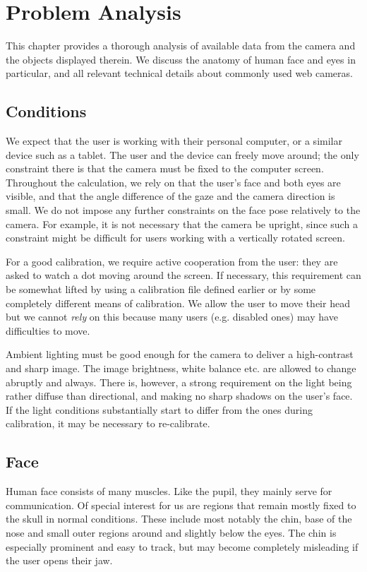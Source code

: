 \chapter{Problem Analysis}

This chapter provides a thorough analysis of available data from the camera and the objects displayed therein.
We discuss the anatomy of human face and eyes in particular, and all relevant technical details about commonly used web cameras.

\section{Conditions}

We expect that the user is working with their personal computer, or a similar device such as a tablet.
The user and the device can freely move around; the only constraint there is that the camera must be fixed to the computer screen.
Throughout the calculation, we rely on that the user's face and both eyes are visible, and that the angle difference of the gaze and the camera direction is small.
We do not impose any further constraints on the face pose relatively to the camera.
For example, it is not necessary that the camera be upright, since such a constraint might be difficult for users working with a vertically rotated screen.

For a good calibration, we require active cooperation from the user: they are asked to watch a dot moving around the screen.
If necessary, this requirement can be somewhat lifted by using a calibration file defined earlier or by some completely different means of calibration.
We allow the user to move their head but we cannot \textit{rely} on this because many users (e.g. disabled ones) may have difficulties to move.

Ambient lighting must be good enough for the camera to deliver a high-contrast and sharp image.
The image brightness, white balance etc. are allowed to change abruptly and always.
There is, however, a strong requirement on the light being rather diffuse than directional, and making no sharp shadows on the user's face.
If the light conditions substantially start to differ from the ones during calibration, it may be necessary to re-calibrate.

\section{Face}

Human face consists of many muscles.
Like the pupil, they mainly serve for communication.
Of special interest for us are regions that remain mostly fixed to the skull in normal conditions.
These include most notably the chin, base of the nose and small outer regions around and slightly below the eyes.
The chin is especially prominent and easy to track, but may become completely misleading if the user opens their jaw.
\todo{\dots}

